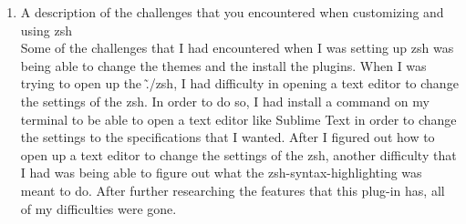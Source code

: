 \documentclass{article}
\begin{document}
\begin{enumerate}
\begin{center}
\end{center}
\item A description of the challenges that you encountered when customizing and using zsh
\\
Some of the challenges that I had encountered when I was setting up zsh was being able to change the themes and the install the plugins. When I was trying to open up the \~./zsh, I had difficulty in opening a text editor to change the settings of the zsh. In order to do so, I had install a command on my terminal to be able to open a text editor like Sublime Text in order to change the settings to the specifications that I wanted. After I figured out how to open up a text editor to change the settings of the zsh, another difficulty that I had was being able to figure out what the zsh-syntax-highlighting was meant to do. After further researching the features that this plug-in has, all of my difficulties were gone.


\end{enumerate}
\end{document}
